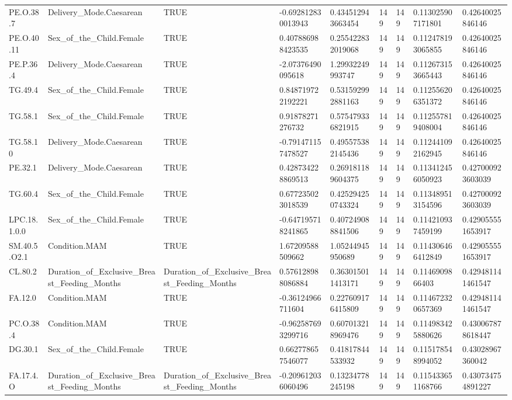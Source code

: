 \begin{longtable}{lllllllll}
PE.O.38.7 & Delivery\_Mode.Caesarean & TRUE & -0.692812830013943 & 0.434512943663454 & 149 & 149 & 0.113025907171801 & 0.42640025846146 \\
PE.O.40.11 & Sex\_of\_the\_Child.Female & TRUE & 0.407886988423535 & 0.255422832019068 & 149 & 149 & 0.112478193065855 & 0.42640025846146 \\
PE.P.36.4 & Delivery\_Mode.Caesarean & TRUE & -2.07376490095618 & 1.29932249993747 & 149 & 149 & 0.112673153665443 & 0.42640025846146 \\
TG.49.4 & Sex\_of\_the\_Child.Female & TRUE & 0.848719722192221 & 0.531592992881163 & 149 & 149 & 0.112556206351372 & 0.42640025846146 \\
TG.58.1 & Sex\_of\_the\_Child.Female & TRUE & 0.91878271276732 & 0.575479336821915 & 149 & 149 & 0.112557819408004 & 0.42640025846146 \\
TG.58.10 & Delivery\_Mode.Caesarean & TRUE & -0.791471157478527 & 0.495575382145436 & 149 & 149 & 0.112441092162945 & 0.42640025846146 \\
PE.32.1 & Delivery\_Mode.Caesarean & TRUE & 0.428734228869513 & 0.269181189604375 & 149 & 149 & 0.113412456050923 & 0.427000923603039 \\
TG.60.4 & Sex\_of\_the\_Child.Female & TRUE & 0.677235023018539 & 0.425294250743324 & 149 & 149 & 0.113489513154596 & 0.427000923603039 \\
LPC.18.1.0.0 & Sex\_of\_the\_Child.Female & TRUE & -0.647195718241865 & 0.407249088841506 & 149 & 149 & 0.114210937459199 & 0.429055551653917 \\
SM.40.5.O2.1 & Condition.MAM & TRUE & 1.67209588509662 & 1.05244945950689 & 149 & 149 & 0.114306466412849 & 0.429055551653917 \\
CL.80.2 & Duration\_of\_Exclusive\_Breast\_Feeding\_Months & Duration\_of\_Exclusive\_Breast\_Feeding\_Months & 0.576128988086884 & 0.363015011413171 & 149 & 149 & 0.1146909866403 & 0.429481141461547 \\
FA.12.0 & Condition.MAM & TRUE & -0.36124966711604 & 0.227609176415809 & 149 & 149 & 0.114672320657369 & 0.429481141461547 \\
PC.O.38.4 & Condition.MAM & TRUE & -0.962587693299716 & 0.607013218969476 & 149 & 149 & 0.114983425880626 & 0.430067878618447 \\
DG.30.1 & Sex\_of\_the\_Child.Female & TRUE & 0.662778657546077 & 0.41817844533932 & 149 & 149 & 0.115178548994052 & 0.43028967360042 \\
FA.17.4.O & Duration\_of\_Exclusive\_Breast\_Feeding\_Months & Duration\_of\_Exclusive\_Breast\_Feeding\_Months & -0.209612036060496 & 0.13234778245198 & 149 & 149 & 0.115433651168766 & 0.430734754891227 \\

\end{longtable}
